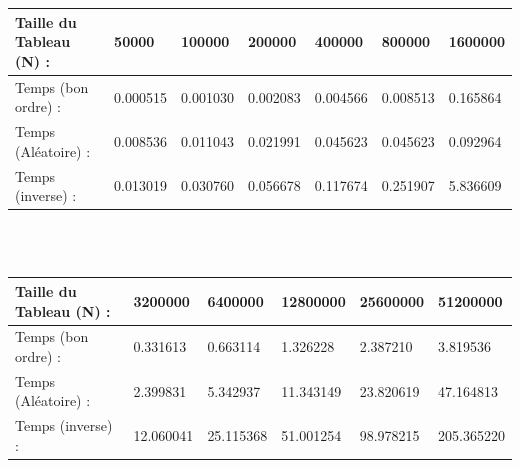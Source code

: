 \documentclass[12pt]{article}
\begin{document}
\color{blue}
\textrm{  }
\\
\\
\begin{tabular}{|p{4cm}||p{1.8cm}|p{1.8cm}|p{1.8cm}|p{1.8cm}|p{1.8cm}|p{1.8cm}|}
\hline
Taille du Tableau (N) : & 50000 & 100000 & 200000 & 400000 & 800000  & 1600000\\
\hline
Temps (bon ordre) : & 0.000515 & 0.001030 & 0.002083 & 0.004566 & 0.008513 & 0.165864  \\
\hline

Temps (Aléatoire) : & 0.008536 & 0.011043 & 0.021991 & 0.045623 & 0.045623 & 0.092964 \\
\hline

Temps (inverse) :  & 0.013019 & 0.030760 & 0.056678 & 0.117674 & 0.251907 & 5.836609  \\
\hline

\end{tabular}
\\
\\
\begin{tabular}{|p{4cm}||p{2.25cm}|p{2.25cm}|p{2.25cm}|p{2.25cm}|p{2.25cm}|}
\hline
Taille du Tableau (N) : & 3200000 & 6400000 & 12800000 & 25600000 &  51200000  \\
\hline

Temps (bon ordre) : & 0.331613 & 0.663114 & 1.326228 & 2.387210 & 3.819536   \\
\hline

Temps (Aléatoire) : & 2.399831 & 5.342937 & 11.343149 & 23.820619 & 47.164813 \\
\hline

Temps (inverse) :  & 12.060041 & 25.115368 & 51.001254 & 98.978215 & 205.365220  \\
\hline

\end{tabular}
\color{black}
\end{document}
